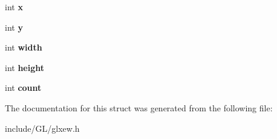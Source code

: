 \begin{DoxyCompactItemize}
\mbox{\label{structGLXBufferClobberEventSGIX_a5118d48c3c8d5253d39922b5014b52ff}} 
int {\bfseries x}
\item 
\mbox{\label{structGLXBufferClobberEventSGIX_aef21efa11558a5b67861f96471c56003}} 
int {\bfseries y}
\item 
\mbox{\label{structGLXBufferClobberEventSGIX_adad23535733161528427584a42bfc6eb}} 
int {\bfseries width}
\item 
\mbox{\label{structGLXBufferClobberEventSGIX_a7838dbabb76c22aa8241310a3f2363ea}} 
int {\bfseries height}
\item 
\mbox{\label{structGLXBufferClobberEventSGIX_ad8f4f0aae058e0a1ff542679823e37a9}} 
int {\bfseries count}
\end{DoxyCompactItemize}


The documentation for this struct was generated from the following file\+:\begin{DoxyCompactItemize}
\item 
include/\+G\+L/glxew.\+h\end{DoxyCompactItemize}
